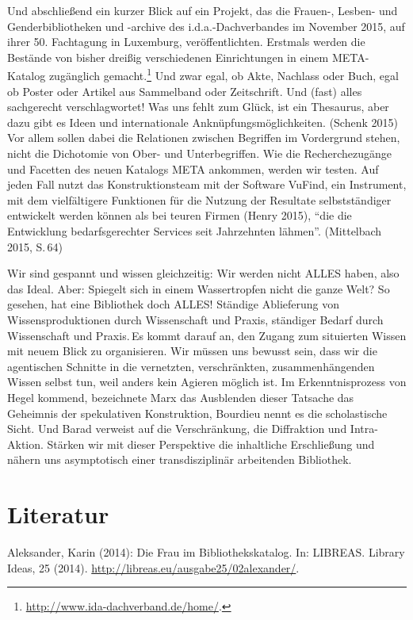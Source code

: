 Und abschließend ein kurzer Blick auf ein Projekt, das die Frauen-,
Lesben- und Genderbibliotheken und -archive des i.d.a.-Dachverbandes im
November 2015, auf ihrer 50. Fachtagung in Luxemburg, veröffentlichten.
Erstmals werden die Bestände von bisher dreißig verschiedenen
Einrichtungen in einem META-Katalog zugänglich gemacht.\footnote{\url{http://www.ida-dachverband.de/home/}.}
Und zwar egal, ob Akte, Nachlass oder Buch, egal ob Poster oder Artikel
aus Sammelband oder Zeitschrift. Und (fast) alles sachgerecht
verschlagwortet! Was uns fehlt zum Glück, ist ein Thesaurus, aber dazu
gibt es Ideen und internationale Anknüpfungsmöglichkeiten. (Schenk 2015)
Vor allem sollen dabei die Relationen zwischen Begriffen im Vordergrund
stehen, nicht die Dichotomie von Ober- und Unterbegriffen. Wie die
Recherchezugänge und Facetten des neuen Katalogs META ankommen, werden
wir testen. Auf jeden Fall nutzt das Konstruktionsteam mit der Software
VuFind, ein Instrument, mit dem vielfältigere Funktionen für die Nutzung
der Resultate selbstständiger entwickelt werden können als bei teuren
Firmen (Henry 2015), \enquote{die die Entwicklung bedarfsgerechter
Services seit Jahrzehnten lähmen}. (Mittelbach 2015, S.\,64)

Wir sind gespannt und wissen gleichzeitig: Wir werden nicht ALLES haben,
also das Ideal. Aber: Spiegelt sich in einem Wassertropfen nicht die
ganze Welt? So gesehen, hat eine Bibliothek doch ALLES! Ständige
Ablieferung von Wissensproduktionen durch Wissenschaft und Praxis,
ständiger Bedarf durch Wissenschaft und Praxis.\,Es kommt darauf an, den
Zugang zum situierten Wissen mit neuem Blick zu organisieren. Wir müssen
uns bewusst sein, dass wir die agentischen Schnitte in die vernetzten,
verschränkten, zusammenhängenden Wissen selbst tun, weil anders kein
Agieren möglich ist. Im Erkenntnisprozess von Hegel kommend, bezeichnete
Marx das Ausblenden dieser Tatsache das Geheimnis der spekulativen
Konstruktion, Bourdieu nennt es die scholastische Sicht. Und Barad
verweist auf die Verschränkung, die Diffraktion und Intra-Aktion.
Stärken wir mit dieser Perspektive die inhaltliche Erschließung und
nähern uns asymptotisch einer transdisziplinär arbeitenden Bibliothek.

\section*{Literatur}

Aleksander, Karin (2014): Die Frau im Bibliothekskatalog. In: LIBREAS.
Library Ideas, 25 (2014).
\url{http://libreas.eu/ausgabe25/02alexander/}.

